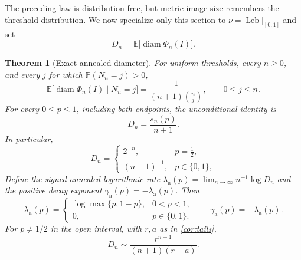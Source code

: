 \documentclass[11pt,a4paper]{amsart}
\newtheorem{theorem}{Theorem}[section]
\theoremstyle{definition}
\theoremstyle{remark}
\newcommand{\Prob}{\mathbb P}
\newcommand{\Exp}{\mathbb E}
\newcommand{\diameter}{\operatorname{diam}}
\newcommand{\Leb}{\operatorname{Leb}}
\begin{document}
The preceding law is distribution-free, but metric image size remembers
the threshold distribution.  We now specialize only this section to
$\nu=\Leb|_{[0,1]}$ and set
\begin{equation}\label{eq:Dn}
 D_n=\Exp\bigl[\diameter\Phi_n(I)\bigr].
\end{equation}

\begin{theorem}[Exact annealed diameter]\label{thm:diameter}
For uniform thresholds, every $n\geq0$, and every $j$ for which
$\Prob(N_n=j)>0$,
\begin{equation}\label{eq:conditional-diameter}
 \Exp\bigl[\diameter\Phi_n(I)\mid N_n=j\bigr]
   =\frac{1}{(n+1)\binom nj},
 \qquad 0\leq j\leq n.
\end{equation}
For every $0\leq p\leq1$, including both endpoints, the unconditional
identity is
\begin{equation}\label{eq:diameter-exact}
 \boxed{\quad D_n=\frac{s_n(p)}{n+1}.\quad}
\end{equation}
In particular,
\begin{equation}\label{eq:diameter-special}
 D_n=
 \begin{cases}
 2^{-n},&p=\tfrac12,\\
 (n+1)^{-1},&p\in\{0,1\},
 \end{cases}
\end{equation}
Define the signed annealed logarithmic rate
$\lambda_{\mathrm a}(p)=\lim_{n\to\infty}n^{-1}\log D_n$ and the positive
decay exponent $\gamma_{\mathrm a}(p)=-\lambda_{\mathrm a}(p)$.  Then
\begin{equation}\label{eq:annealed-rate}
 \lambda_{\mathrm a}(p)
 =\begin{cases}
   \log\max\{p,1-p\},&0<p<1,\\
   0,&p\in\{0,1\}.
  \end{cases}
 \qquad
 \gamma_{\mathrm a}(p)=-\lambda_{\mathrm a}(p).
\end{equation}
For $p\neq1/2$ in the open interval, with $r,a$ as in
\cref{cor:tails},
\begin{equation}\label{eq:diameter-asymptotic}
 D_n\sim\frac{r^{n+1}}{(n+1)(r-a)}.
\end{equation}
\end{theorem}
\end{document}
